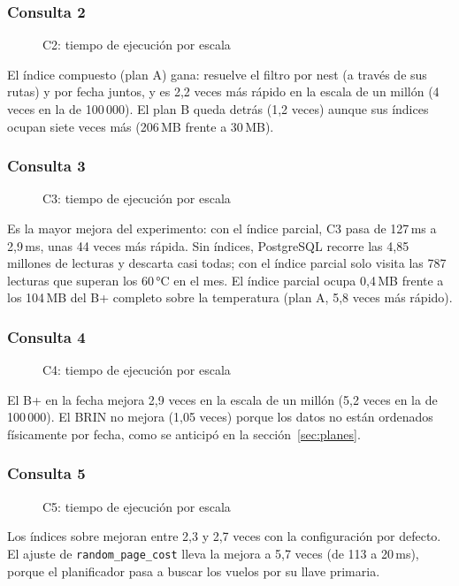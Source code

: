\subsubsection{Consulta 2}
\begin{figure}[H]\centering{}\caption{C2: tiempo de ejecución por escala}\end{figure}
El índice compuesto (plan A) gana: resuelve el filtro por nest (a través de sus rutas) y por fecha juntos, y es 2,2 veces más rápido en la escala de un millón (4 veces en la de 100\,000). El plan B queda detrás (1,2 veces) aunque sus índices ocupan siete veces más (206\,MB frente a 30\,MB).

\subsubsection{Consulta 3}
\begin{figure}[H]\centering{}\caption{C3: tiempo de ejecución por escala}\end{figure}
Es la mayor mejora del experimento: con el índice parcial, C3 pasa de 127\,ms a 2,9\,ms, unas 44 veces más rápida. Sin índices, PostgreSQL recorre las 4,85 millones de lecturas y descarta casi todas; con el índice parcial solo visita las 787 lecturas que superan los 60\,°C en el mes. El índice parcial ocupa 0,4\,MB frente a los 104\,MB del B+ completo sobre la temperatura (plan A, 5,8 veces más rápido).

\subsubsection{Consulta 4}
\begin{figure}[H]\centering{}\caption{C4: tiempo de ejecución por escala}\end{figure}
El B+ en la fecha mejora 2,9 veces en la escala de un millón (5,2 veces en la de 100\,000). El BRIN no mejora (1,05 veces) porque los datos no están ordenados físicamente por fecha, como se anticipó en la sección~\ref{sec:planes}.

\subsubsection{Consulta 5}
\begin{figure}[H]\centering{}\caption{C5: tiempo de ejecución por escala}\end{figure}
Los índices sobre  mejoran entre 2,3 y 2,7 veces con la configuración por defecto. El ajuste de \texttt{random\_page\_cost} lleva la mejora a 5,7 veces (de 113 a 20\,ms), porque el planificador pasa a buscar los vuelos por su llave primaria.

